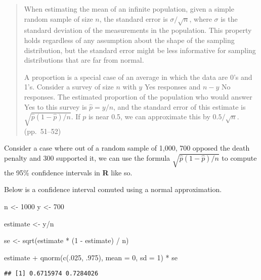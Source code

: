 \documentclass[
]{article}
\newenvironment{Shaded}{\begin{snugshade}}{\end{snugshade}}
\newcommand{\AttributeTok}[1]{\textcolor[rgb]{0.77,0.63,0.00}{#1}}
\newcommand{\DecValTok}[1]{\textcolor[rgb]{0.00,0.00,0.81}{#1}}
\newcommand{\FunctionTok}[1]{\textcolor[rgb]{0.00,0.00,0.00}{#1}}
\newcommand{\NormalTok}[1]{#1}
\newcommand{\OtherTok}[1]{\textcolor[rgb]{0.56,0.35,0.01}{#1}}
\newcommand{\SpecialCharTok}[1]{\textcolor[rgb]{0.00,0.00,0.00}{#1}}
\begin{document}
\begin{quote}
When estimating the mean of an infinite population, given a simple
random sample of size \(n\), the standard error is \(\sigma / \sqrt n\),
where \(\sigma\) is the standard deviation of the measurements in the
population. This property holds regardless of any assumption about the
shape of the sampling distribution, but the standard error might be less
informative for sampling distributions that are far from normal.

A proportion is a special case of an average in which the data are 0's
and 1's. Consider a survey of size \(n\) with \(y\) Yes responses and
\(n - y\) No responses. The estimated proportion of the population who
would answer Yes to this survey is \(\hat p = y / n\), and the standard
error of this estimate is \(\sqrt{\hat p (1 - \hat p) / n}\). If \(p\)
is near 0.5, we can approximate this by \(0.5 / \sqrt n\). (pp.~51--52)
\end{quote}

Consider a case where out of a random sample of 1,000, 700 opposed the
death penalty and 300 supported it, we can use the formula
\(\sqrt{\hat p (1 - \hat p) / n}\) to compute the 95\% confidence
intervals in \textbf{R} like so.

Below is a confidence interval comuted using a normal approximation.

\begin{Shaded}
\begin{Highlighting}[]
\NormalTok{n }\OtherTok{\textless{}{-}} \DecValTok{1000}
\NormalTok{y }\OtherTok{\textless{}{-}} \DecValTok{700}

\NormalTok{estimate }\OtherTok{\textless{}{-}}\NormalTok{ y}\SpecialCharTok{/}\NormalTok{n}

\NormalTok{se }\OtherTok{\textless{}{-}} \FunctionTok{sqrt}\NormalTok{(estimate }\SpecialCharTok{*}\NormalTok{ (}\DecValTok{1} \SpecialCharTok{{-}}\NormalTok{ estimate) }\SpecialCharTok{/}\NormalTok{ n)}

\NormalTok{estimate }\SpecialCharTok{+} \FunctionTok{qnorm}\NormalTok{(}\FunctionTok{c}\NormalTok{(.}\DecValTok{025}\NormalTok{, .}\DecValTok{975}\NormalTok{), }\AttributeTok{mean =} \DecValTok{0}\NormalTok{, }\AttributeTok{sd =} \DecValTok{1}\NormalTok{) }\SpecialCharTok{*}\NormalTok{ se}
\end{Highlighting}
\end{Shaded}

\begin{verbatim}
## [1] 0.6715974 0.7284026
\end{verbatim}
\end{document}

